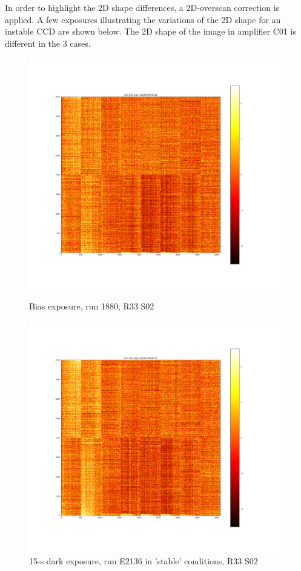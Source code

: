 In order to highlight the 2D shape differences, a 2D-overscan correction
is applied. A few exposures illustrating the variations of the 2D shape
for an instable CCD are shown below. The 2D shape of the image in
amplifier C01 is different in the 3 cases.

\begin{figure}[htbp]
\centering
\begin{minipage}{0.45\textwidth}
    \centering
    \includegraphics[width=\textwidth]{sections/figures/E1880_bias_R33_S02.png}
    \caption{Bias exposure, run 1880, R33 S02}
\end{minipage}
\hfill
\begin{minipage}{0.45\textwidth}
    \centering
    \includegraphics[width=\textwidth]{sections/figures/E2136_dark15_R33_S02.png}
    \caption{15-s dark exposure, run E2136 in 'stable' conditions, R33 S02}
\end{minipage}


\end{figure}
